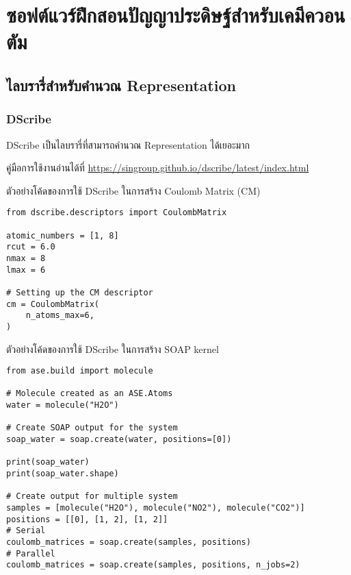 

\chapter{ซอฟต์แวร์ฝึกสอนปัญญาประดิษฐ์สำหรับเคมีควอนตัม}
\label{ch:ml_lib}

\section{ไลบรารี่สำหรับคำนวณ Representation}

\subsection{DScribe}

DScribe เป็นไลบรารี่ที่สามารถคำนวณ Representation ได้เยอะมาก\cite{himanen2020}

คู่มือการใช้งานอ่านได้ที่ \url{https://singroup.github.io/dscribe/latest/index.html}

\noindent ตัวอย่างโค้ดของการใช้ DScribe ในการสร้าง Coulomb Matrix (CM)

\begin{lstlisting}[style=MyPython]
from dscribe.descriptors import CoulombMatrix

atomic_numbers = [1, 8]
rcut = 6.0
nmax = 8
lmax = 6

# Setting up the CM descriptor
cm = CoulombMatrix(
    n_atoms_max=6,
)
\end{lstlisting}

\noindent ตัวอย่างโค้ดของการใช้ DScribe ในการสร้าง SOAP kernel

\begin{lstlisting}[style=MyPython]
from ase.build import molecule

# Molecule created as an ASE.Atoms
water = molecule("H2O")

# Create SOAP output for the system
soap_water = soap.create(water, positions=[0])

print(soap_water)
print(soap_water.shape)

# Create output for multiple system
samples = [molecule("H2O"), molecule("NO2"), molecule("CO2")]
positions = [[0], [1, 2], [1, 2]]
# Serial
coulomb_matrices = soap.create(samples, positions)
# Parallel     
coulomb_matrices = soap.create(samples, positions, n_jobs=2)
\end{lstlisting}

